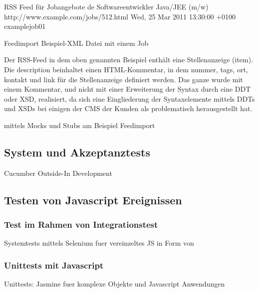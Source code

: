 \begin{ruby}[label=beispiel\_job.xml, fontsize=\relsize{-2}]
 
    RSS Feed für Jobangebote 
    de
      Softwareentwickler Java/JEE (m/w)
        \PY{c+cp}{<![CDATA[}
\PY{c+cp}{        ]]>}
      http://www.example.com/jobs/512.html
      Wed, 25 Mar 2011 13:30:00 +0100
      example\PYZus{}job\PYZus{}01
\end{ruby}
\captionsetup{type=lstlisting}
\caption{Feedimport Beispiel-XML Datei mit einem Job}
Der RSS-Feed in dem oben genannten Beispiel enthält eine Stellenanzeige (item). Die description beinhaltet einen HTML-Kommentar, in dem nummer, tags, ort, kontakt und link für die Stellenanzeige definiert werden. Das ganze wurde mit einem Kommentar, und nicht mit einer Erweiterung der Syntax durch eine DDT oder XSD, realisiert, da sich eine Eingliederung der Syntaxelemente mittels DDTs und XSDs bei einigen der CMS der Kunden als problematisch herausgestellt hat.



 
 
 mittels Mocks und Stubs am Beispiel Feedimport

\subsection{System und Akzeptanztests}
Cucumber Outside-In Development


\subsection{Testen von Javascript Ereignissen}
\subsubsection{Test im Rahmen von Integrationstest}
Systemtests mittels Selenium fuer vereinzeltes JS in Form von

\subsubsection{Unittests mit Javascript}
Unittests:  Jasmine fuer komplexe Objekte und Javascript Anwendungen






